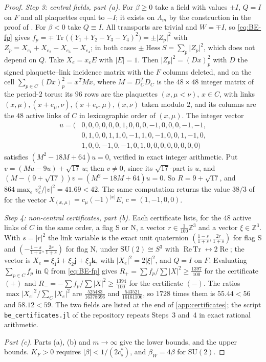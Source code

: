 \documentclass[11pt,a4paper]{amsart}
\theoremstyle{definition}
\theoremstyle{remark}
\numberwithin{equation}{section}
\DeclareMathOperator{\Tr}{Tr}        %
\DeclareMathOperator{\ReTr}{Re\,Tr}  %
\DeclareMathOperator{\Hess}{Hess}    %
\newcommand{\Z}{\mathbb{Z}}          %
\newcommand{\abs}[1]{\lvert #1\rvert}      %
\newcommand{\SU}{\mathrm{SU}}              %
\newcommand{\betaW}{\beta_{W}}             %
\begin{document}
\begin{proof}
\emph{Step 3: central fields, part (a).} For $\beta\ge0$ take a field with values $\pm I$, $Q=I$ on $F$ and all plaquettes equal to $-I$; it exists on $\Lambda_m$ by the construction in the proof of \cite[Theorem~A5]{bhattacharjee2026first}. For $\beta<0$ take $Q\equiv I$. All transports are trivial and $W=\mp I$, so \eqref{eq:BE-fp} gives $f_p=\mp\Tr\bigl((Y_1+Y_2-Y_3-Y_4)^2\bigr)=\pm\abs{Z_p}^2$ with $Z_p=X_{e_1}+X_{e_2}-X_{e_3}-X_{e_4}$; in both cases $\pm\Hess S=\sum_p\abs{Z_p}^2$, which does not depend on $Q$. Take $X_e=x_eE$ with $\abs E=1$. Then $\abs{Z_p}^2=(Dx)_p^2$ with $D$ the signed plaquette--link incidence matrix with the $F$ columns deleted, and on the cell $\sum_{p\in C}(Dx)_p^2=x^TMx$, where $M=D_C^TD_C$ is the $48\times48$ integer matrix of the period-$2$ torus: its $96$ rows are the plaquettes $(x,\mu<\nu)$, $x\in C$, with links $(x,\mu),(x+e_\mu,\nu),(x+e_\nu,\mu),(x,\nu)$ taken modulo $2$, and its columns are the $48$ active links of $C$ in lexicographic order of $(x,\mu)$. The integer vector
\[
\begin{aligned}
u=(&0,0,0,0,0,0,1,0,0,0,-1,0,0,0,-1,-1,\\
&0,1,0,0,1,1,0,-1,1,0,-1,0,0,1,-1,0,\\
&1,0,0,-1,0,-1,0,1,0,0,0,0,0,0,0,0)
\end{aligned}
\]
satisfies $(M^2-18M+64)u=0$, verified in exact integer arithmetic. Put $v=(Mu-9u)+\sqrt{17}\,u$; then $v\ne0$, since its $\sqrt{17}$-part is $u$, and $(M-(9+\sqrt{17}))v=(M^2-18M+64)u=0$. So $R=9+\sqrt{17}$, and $864\max_ev_e^2/\abs v^2=41.69<42$. The same computation returns the value $38/3$ of \cite[Theorem~A5]{bhattacharjee2026first} for the vector $X_{(x,\mu)}=c_\mu(-1)^{\abs x}E$, $c=(1,-1,0,0)$.

\emph{Step 4: non-central certificates, part (b).} Each certificate lists, for the $48$ active links of $C$ in the same order, a flag S or N, a vector $r\in\frac1{100}\Z^3$ and a vector $\xi\in\Z^3$. With $s=\abs r^2$ the link variable is the exact unit quaternion $(\frac{1-s}{1+s},\frac{2r}{1+s})$ for flag S and $(-\frac{1-s}{1+s},\frac{2r}{1+s})$ for flag N, under $\SU(2)\cong S^3$ with $\ReTr\leftrightarrow2\operatorname{Re}$; the vector is $X_e=\xi_1\mathbf i+\xi_2\mathbf j+\xi_3\mathbf k$, with $\abs{X_e}^2=2\abs\xi^2$, and $Q=I$ on $F$. Evaluating $\sum_{p\in C}f_p$ in $\mathbb Q$ from \eqref{eq:BE-fp} gives $R_+=\sum f_p/\sum\abs X^2\ge\frac{1397}{100}$ for the certificate $(+)$ and $R_-=-\sum f_p/\sum\abs X^2\ge\frac{1394}{100}$ for the certificate $(-)$. The ratios $\max\abs{X_e}^2/\sum_C\abs{X_e}^2$ are $\frac{525483}{16378696}$ and $\frac{543521}{16161106}$, so $1728$ times them is $55.44<56$ and $58.12<59$. The two fields are listed at the end of \cref{app:certificates}; the script \texttt{be\_certificates.jl} of the repository \cite{repo4YM} repeats Steps~3 and~4 in exact rational arithmetic.

\emph{Part (c).} Parts (a), (b) and $m\to\infty$ give the lower bounds, and \cite[Theorem~1]{bhattacharjee2026first} the upper bounds. $K_F>0$ requires $\abs\beta<1/(2c^*_s)$, and $\betaW=4\beta$ for $\SU(2)$.
\end{proof}
\end{document}
